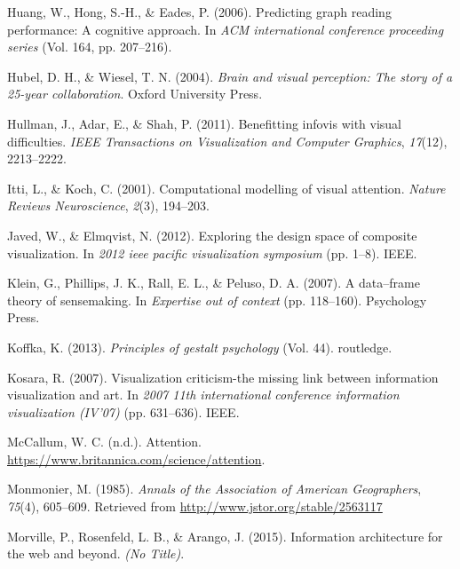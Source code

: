 \documentclass[print]{nuthesis}
\newlength{\cslhangindent}
\newenvironment{CSLReferences}[2]%
{\setlength{\parindent}{0pt}%
\everypar{\setlength{\hangindent}{\cslhangindent}}\ignorespaces}%
{\par}
\begin{document}
\begin{CSLReferences}{1}{0}
\leavevmode{}%
Huang, W., Hong, S.-H., \& Eades, P. (2006). Predicting graph reading performance: A cognitive approach. In \emph{ACM international conference proceeding series} (Vol. 164, pp. 207--216).

\leavevmode{}%
Hubel, D. H., \& Wiesel, T. N. (2004). \emph{Brain and visual perception: The story of a 25-year collaboration}. Oxford University Press.

\leavevmode{}%
Hullman, J., Adar, E., \& Shah, P. (2011). Benefitting infovis with visual difficulties. \emph{IEEE Transactions on Visualization and Computer Graphics}, \emph{17}(12), 2213--2222.

\leavevmode{}%
Itti, L., \& Koch, C. (2001). Computational modelling of visual attention. \emph{Nature Reviews Neuroscience}, \emph{2}(3), 194--203.

\leavevmode{}%
Javed, W., \& Elmqvist, N. (2012). Exploring the design space of composite visualization. In \emph{2012 ieee pacific visualization symposium} (pp. 1--8). IEEE.

\leavevmode{}%
Klein, G., Phillips, J. K., Rall, E. L., \& Peluso, D. A. (2007). A data--frame theory of sensemaking. In \emph{Expertise out of context} (pp. 118--160). Psychology Press.

\leavevmode{}%
Koffka, K. (2013). \emph{Principles of gestalt psychology} (Vol. 44). routledge.

\leavevmode{}%
Kosara, R. (2007). Visualization criticism-the missing link between information visualization and art. In \emph{2007 11th international conference information visualization (IV'07)} (pp. 631--636). IEEE.

\leavevmode{}%
McCallum, W. C. (n.d.). Attention. \url{https://www.britannica.com/science/attention}.

\leavevmode{}%
Monmonier, M. (1985). \emph{Annals of the Association of American Geographers}, \emph{75}(4), 605--609. Retrieved from \url{http://www.jstor.org/stable/2563117}

\leavevmode{}%
Morville, P., Rosenfeld, L. B., \& Arango, J. (2015). Information architecture for the web and beyond. \emph{(No Title)}.


\end{CSLReferences}
\end{document}
